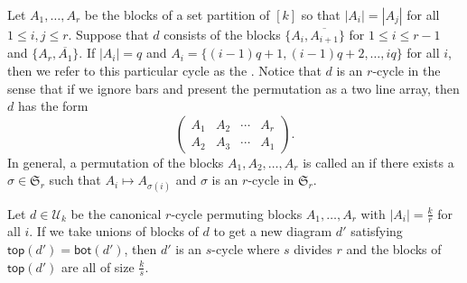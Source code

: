 Let $A_1, \ldots, A_r$ be the blocks of a set partition of $[k]$ so that $|A_i| = |A_j|$ for all $1\leqslant i, j\leqslant r$. Suppose that $d$ consists of
the blocks $\{A_i, \overline{A_{i+1}}\}$ for $1\leqslant i \leqslant r-1$ and $\{A_r, \overline{A_1}\}$. If $|A_i|=q$ and $A_i =\{(i-1)q +1, (i-1)q +2,\ldots, iq\}$ 
for all $i$, then we refer to this particular cycle as the .  Notice that $d$ is an $r$-cycle in the sense that if we
ignore bars and present the permutation as a two line array, then $d$ has the form
\[
    \left( \begin{array}{cccc}
    A_1 & A_2 & \cdots & A_r\\
    A_2 & A_3 & \cdots & A_1
    \end{array}\right).
\]
In general, a permutation of the blocks $A_1, A_2, \ldots, A_r$ is called an
 if there exists a $\sigma\in \mathfrak{S}_r$ such that $A_i \mapsto A_{\sigma(i)}$ and $\sigma$ is an $r$-cycle in $\mathfrak{S}_r$.

\begin{lemma}
\label{lem:onecycle}
Let $d\in \mathcal{U}_k$ be the canonical $r$-cycle permuting blocks $A_1, \ldots, A_r$ with $|A_i| = \frac{k}{r}$ for all $i$.
If we take unions of blocks of $d$ to get a new diagram $d'$ satisfying $\mathsf{top}(d') = \mathsf{bot}(d')$, then $d'$ is an $s$-cycle where $s$
divides $r$ and the blocks of $\mathsf{top}(d')$ are all of size $\frac{k}{s}$.
\end{lemma}

